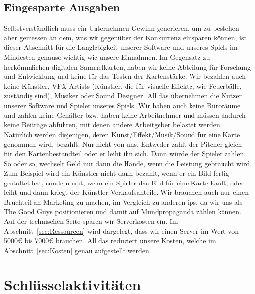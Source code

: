 \documentclass[fontsize=11, a4aper]{scrartcl}
\begin{document}

\subsection{Eingesparte Ausgaben} \label{subsec:Eingesparte_Ausgaben}

Selbstverständlich muss ein Unternehmen Gewinn generieren, um zu bestehen aber gemessen an dem, was wir gegenüber der Konkurrenz einsparen können, ist dieser Abschnitt für die Langlebigkeit unserer Software und unseres Spiels im Mindesten genauso wichtig wie unsere Einnahmen. Im Gegensatz zu herkömmlichen digitalen Sammelkarten, haben wir keine Abteilung für Forschung und Entwicklung und keine für das Testen der Kartenstärke. Wir bezahlen auch keine Künstler, VFX Artists (Künstler, die für visuelle Effekte, wie Feuerbälle, zuständig sind), Musiker oder Sound Designer. All das übernehmen die Nutzer unserer Software und Spieler unseres Spiels. Wir haben auch keine Büroräume und zahlen keine Gehälter bzw. haben keine Arbeitnehmer und müssen dadurch keine Beiträge abführen, mit denen andere Arbeitgeber belastet werden. Natürlich werden diejenigen, deren Kunst/Effekt/Musik/Sound für eine Karte genommen wird, bezahlt. Nur nicht von uns. Entweder zahlt der Pitcher gleich für den Kartenbestandteil oder er leiht ihn sich. Dann würde der Spieler zahlen. So oder so, wechselt Geld nur dann die Hände, wenn die Leistung gebraucht wird. Zum Beispiel wird ein Künstler nicht dann bezahlt, wenn er ein Bild fertig gestaltet hat, sondern erst, wenn ein Spieler das Bild für eine Karte kauft, oder leiht und dann kriegt der Künstler Verkaufsanteile. Wir brauchen auch nur einen Bruchteil an Marketing zu machen, im Vergleich zu anderen \acp{ip}, da wir uns als \glqq The Good Guys\grqq{} positionieren und damit auf Mundpropaganda zählen können. Auf der technischen Seite sparen wir Serverkosten ein. Im Abschnitt~\ref{sec:Ressourcen} wird dargelegt, dass wir einen Server im Wert von 5000€ bis 7000€ brauchen. All das reduziert unsere Kosten, welche im Abschnitt~\ref{sec:Kosten} genau aufgestellt werden.

\section{Schlüsselaktivitäten} \label{sec:Schlüsselaktivitaeten}
\end{document}

